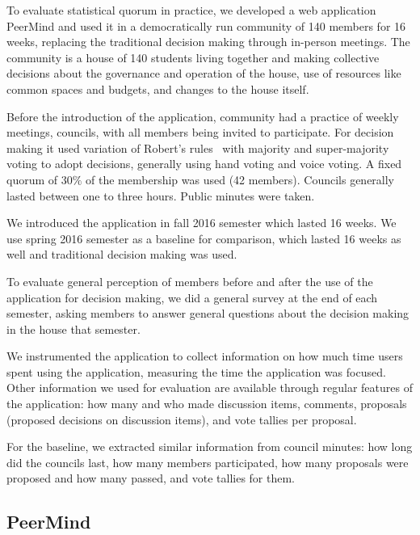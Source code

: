 \documentclass[format=acmsmall, review=true, screen=true, anonymous=true]{acmart}
\begin{document}
To evaluate statistical quorum in practice, we developed a web application PeerMind and
used it in a democratically run community of 140 members for 16 weeks, replacing the traditional
decision making through in-person meetings. The community is a house of 140
students living together and making collective decisions about the governance and operation of
the house, use of resources like common spaces and budgets, and changes to the house itself.

Before the introduction of the application, community had a practice of weekly meetings, councils, with all
members being invited to participate. For decision making it used variation of Robert's rules~\cite{roberts}
with majority and super-majority voting to adopt decisions, generally using hand voting and voice voting.
A fixed quorum of $30\%$ of the membership was used (42 members). Councils generally lasted between one to three hours.
Public minutes were taken.

We introduced the application in fall 2016 semester which lasted 16 weeks. We use spring 2016 semester as
a baseline for comparison, which lasted 16 weeks as well and traditional decision making was used.

To evaluate general perception of members before and after the use of the application for decision making,
we did a general survey at the end of each semester, asking members to answer general questions about the
decision making in the house that semester.

We instrumented the application to collect information on how much time users spent using the application,
measuring the time the application was focused. Other information we used for evaluation are available
through regular features of the application: how many and who made discussion items, comments, proposals
(proposed decisions on discussion items), and vote tallies per proposal.

For the baseline, we extracted similar information from council minutes: how long did the councils last,
how many members participated, how many proposals were proposed and how many passed, and vote tallies for them.


\subsection{PeerMind}
\label{sec:peermind}
\end{document}
